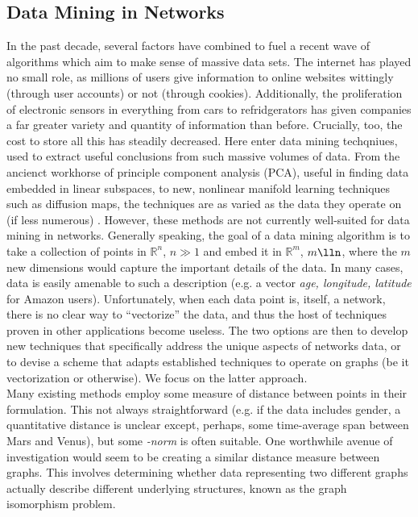 \documentclass[11pt]{article}
\begin{document}
\subsection{Data Mining in Networks}
In the past decade, several factors have combined to fuel a recent wave of algorithms which aim to make sense of massive data sets. The internet has played no small role, as millions of users give information to online websites wittingly (through user accounts) or not (through cookies). Additionally, the proliferation of electronic sensors in everything from cars to refridgerators \cite{hopefully that's true} has given companies a far greater variety and quantity of information than before. Crucially, too, the cost to store all this has steadily decreased. Here enter data mining techqniues, used to extract useful conclusions from such massive volumes of data. From the ancienct workhorse of principle component analysis (PCA), useful in finding data embedded in linear subspaces, to new, nonlinear manifold learning techniques such as diffusion maps, the techniques are as varied as the data they operate on (if less numerous) \cite{data mining papers}. However, these methods are not currently well-suited for data mining in networks. Generally speaking, the goal of a data mining algorithm is to take a collection of points in $\mathbb{R}^{n}$, $n\gg1$ and embed it in $\mathbb{R}^{m}$, $m\lln$, where the $m$ new dimensions would capture the important details of the data. In many cases, data is easily amenable to such a description (e.g. a vector \textit{{age, longitude, latitude}} for Amazon users). Unfortunately, when each data point is, itself, a network, there is no clear way to ``vectorize'' the data, and thus the host of techniques proven in other applications become useless. The two options are then to develop new techniques that specifically address the unique aspects of networks data, or to devise a scheme that adapts established techniques to operate on graphs (be it vectorization or otherwise). We focus on the latter approach. \vspace{1mm}\\
Many existing methods employ some measure of distance between points in their formulation. This not always straightforward (e.g. if the data includes gender, a quantitative distance is unclear except, perhaps, some time-average span between Mars and Venus), but some \textit{-norm} is often suitable. One worthwhile avenue of investigation would seem to be creating a similar distance measure between graphs. This involves determining whether data representing two different graphs actually describe different underlying structures, known as the graph isomorphism problem.
\end{document}
